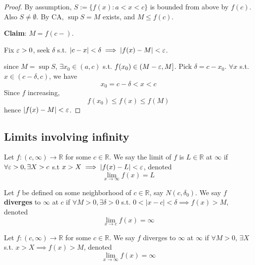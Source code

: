 \begin{proof}
    By assumption, $S:= \{ f(x) : a < x < c \} $
    is bounded from above by $f(c)$. Also $S \neq \emptyset$.
    By CA, $\sup S = M$ exists,
    and $M \leq f(c)$. 
    \medskip

    \textbf{Claim}: $M = f(c-)$.
    \medskip

    Fix $\varepsilon > 0$, seek $\delta$ s.t. 
    $|c - x | < \delta \implies |f(x) - M | < \varepsilon$.
    \medskip

    since $M = \sup S$, 
    $\exists x_0 \in (a, c)$ s.t. 
    $f(x_0) \in (M - \varepsilon, M]$.
    Pick $\delta = c - x_0$.
    $\forall x$ s.t. 
    $x \in (c - \delta, c)$, we have 
    \[
        x_0 = c - \delta < x < c
    \]
    Since $f$ increasing, 
    \[
        f(x_0) \leq f(x) \leq f(M)
    \]
    hence $|f(x) - M| < \varepsilon$.
\end{proof}

\subsection{Limits involving infinity}

\begin{definition}
    Let $f: (c, \infty) \to \mathbb{R}$ for some $c \in \mathbb{R}$. 
    We say the limit of $f$ is $L \in \mathbb{R}$ at $\infty$
    if $\forall \varepsilon > 0, \exists X > c$ s.t 
    $x > X \implies |f(x) - L | < \varepsilon$, denoted 
    \[
        \lim_{x \to \infty} f(x)= L
    \]
\end{definition}

\begin{definition}
    Let $f$ be defined on some neighborhood of $c \in \mathbb{R}$,
    say $N(c, \delta_0)$. We 
    say $f$ \textbf{diverges} to $\infty$ at $c$
    if $\forall M > 0, \exists \delta > 0$ s.t. 
    $0 < |x-c| < \delta \implies f(x) > M$, denoted
    \[
        \lim_{x \to c}f(x) = \infty
    \]
\end{definition}

\begin{definition}
    Let $f: (c, \infty) \to \mathbb{R}$ for some $c \in \mathbb{R}$.
    We say $f$ diverges to $\infty$ at $\infty$ if 
    $\forall M > 0$, $\exists X $ s.t. 
    $x > X \implies f(x) > M$,
    denoted
    \[
        \lim_{x \to \infty} f(x) = \infty
    \]
\end{definition}

\newpage

